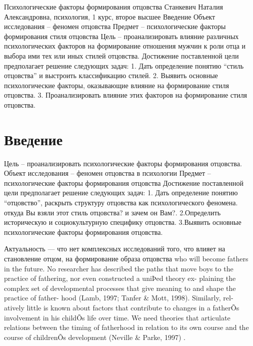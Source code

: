 \documentclass{../../common/thesisbyxetex}
\begin{document}
 
 Психологические факторы формирования отцовства
Станкевич Наталия Александровна,
психология, 1 курс, второе высшее
Введение
Объект исследования – феномен отцовства
Предмет – психологические факторы формирования стиля отцовства
Цель – проанализировать влияние различных психологических факторов на формирование отношения мужчин 
к роли отца и выбора ими тех или иных стилей отцовства. 
Достижение поставленной цели предполагает решение следующих задач:
1. Дать определение понятию “стиль отцовства” и выстроить классификацию стилей.
2. Выявить основные психологические факторы, оказывающие влияние на формирование стиля отцовства.
3. Проанализировать влияние этих факторов на формирование стиля отцовства.


\section*{Введение} 

Цель – проанализировать психологические факторы формирования отцовства.
Объект исследования – феномен отцовства в психологии
Предмет – психологические факторы формирования отцовства
Достижение поставленной цели предполагает решение следующих задач:
1. Дать определение понятию “отцовство”, раскрыть структуру отцовства как психологического феномена.
откуда Вы взяли этот стиль отцовства? и зачем он Вам?.
2.Определить историческую и социокультурную специфику отцовства.
3.Выявить основные психологические факторы формирования отцовства.


Актуальность --- что нет комплексных исследований того, что влияет на становление отцом, на 
формирование образа отцовства who will become fathers in the future. No researcher
has described the paths that move boys to the practice
of fathering, nor even constructed a uniÞed theory ex-
plaining the complex set of developmental processes
that give meaning to and shape the practice of father-
hood (Lamb, 1997; Tanfer \& Mott, 1998). Similarly, rel-
atively little is known about factors that contribute to
changes in a fatherÕs involvement in his childÕs life
over time. We need theories that articulate relations
between the timing of fatherhood in relation to its
own course and the course of childrenÕs development
(Neville \& Parke, 1997) \cite[131]{f21}.
\end{document}
